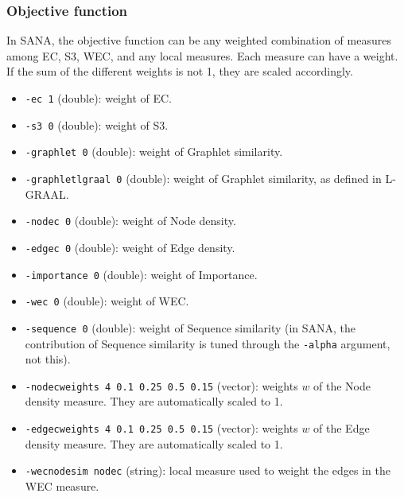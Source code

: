 \documentclass[]{article}
\begin{document}
\subsubsection*{Objective function}
In SANA, the objective function can be any weighted combination of measures among EC, S3, WEC, and any local measures. Each measure can have a weight. If the sum of the different weights is not 1, they are scaled accordingly.

\begin{itemize}
\item\texttt{-ec 1} (double): weight of EC.
\item\texttt{-s3 0} (double): weight of S3.
\item\texttt{-graphlet 0} (double): weight of Graphlet similarity.
\item\texttt{-graphletlgraal 0} (double): weight of Graphlet similarity, as defined in L-GRAAL.
\item\texttt{-nodec 0} (double): weight of Node density.
\item\texttt{-edgec 0} (double): weight of Edge density.
\item\texttt{-importance 0} (double): weight of Importance.
\item\texttt{-wec 0} (double): weight of WEC.
\item\texttt{-sequence 0} (double): weight of Sequence similarity (in SANA, the contribution of Sequence similarity is tuned through the \texttt{-alpha} argument, not this).
\item\texttt{-nodecweights 4 0.1 0.25 0.5 0.15} (vector): weights $w$ of the Node density measure. They are automatically scaled to 1.
\item\texttt{-edgecweights 4 0.1 0.25 0.5 0.15} (vector): weights $w$ of the Edge density measure. They are automatically scaled to 1.
\item\texttt{-wecnodesim nodec} (string): local measure used to weight the edges in the WEC measure.
\end{itemize}
\end{document}
